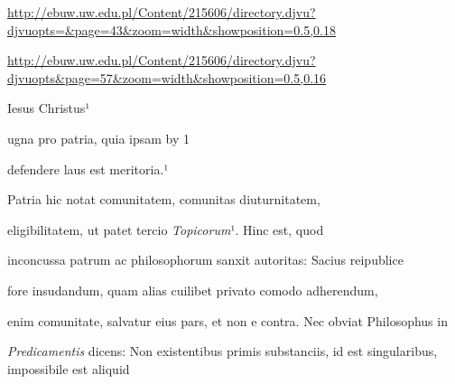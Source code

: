 
\newParkoszpage

{
\url{http://ebuw.uw.edu.pl/Content/215606/directory.djvu?djvuopts=&page=43&zoom=width&showposition=0.5,0.18}

\url{http://ebuw.uw.edu.pl/Content/215606/directory.djvu?djvuopts&page=57&zoom=width&showposition=0.5,0.16}
}


\fulllines
  
  Iesus Christus¹

  ugna pro patria, quia ipsam
  \advance\plineno by 1


defendere laus est meritoria.¹
%




  
Patria hic notat comunitatem, comunitas diuturnitatem, 

 eligibilitatem, ut patet tercio \textit{Topicorum}¹. Hinc est, quod

inconcussa patrum ac philosophorum sanxit autoritas: Sacius reipublice

fore insudandum, quam alias cuilibet privato comodo adherendum, 

 enim comunitate, salvatur eius pars, et non e contra. Nec obviat Philosophus in

\textit{Predicamentis} dicens: Non existentibus primis substanciis, id est singularibus, impossibile est aliquid



